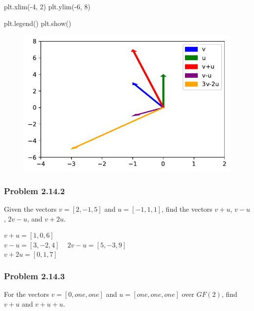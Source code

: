 \documentclass[
  letterpaper,
  DIV=11,
  numbers=noendperiod]{scrartcl}
\newenvironment{Shaded}{\begin{snugshade}}{\end{snugshade}}
\newcommand{\DecValTok}[1]{\textcolor[rgb]{0.68,0.00,0.00}{#1}}
\newcommand{\NormalTok}[1]{\textcolor[rgb]{0.00,0.23,0.31}{#1}}
\newcommand{\OperatorTok}[1]{\textcolor[rgb]{0.37,0.37,0.37}{#1}}
\begin{document}
\begin{Shaded}
\begin{Highlighting}[numbers=left,,]
\NormalTok{plt.xlim(}\OperatorTok{{-}}\DecValTok{4}\NormalTok{, }\DecValTok{2}\NormalTok{)}
\NormalTok{plt.ylim(}\OperatorTok{{-}}\DecValTok{6}\NormalTok{, }\DecValTok{8}\NormalTok{)}

\NormalTok{plt.legend()}
\NormalTok{plt.show()}
\end{Highlighting}
\end{Shaded}

\begin{figure}[H]

{\centering \includegraphics{Chapter-2-Assignment_files/figure-pdf/cell-2-output-1.pdf}

}

\end{figure}

\hypertarget{problem-2.14.2}{%
\subsubsection{Problem 2.14.2}\label{problem-2.14.2}}

Given the vectors \(v = [2, -1, 5]\) and \(u = [-1, 1, 1]\), find the
vectors \(v+u\), \(v-u\), \(2v-u\), and \(v+2u\).

\(v+u = [1, 0, 6]\)\\
\(v-u = [3, -2, 4]\) ~ \(2v-u = [5, -3, 9]\)\\
\(v+2u = [0, 1, 7]\)

\hypertarget{problem-2.14.3}{%
\subsubsection{Problem 2.14.3}\label{problem-2.14.3}}

For the vectors \(v=[0, one, one]\) and \(u=[one, one, one]\) over
\(GF(2)\), find \(v+u\) and \(v+u+u\).
\end{document}
